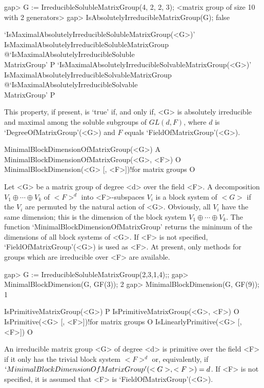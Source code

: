 \beginexample
gap> G := IrreducibleSolubleMatrixGroup(4, 2, 2, 3);
<matrix group of size 10 with 2 generators>
gap> IsAbsolutelyIrreducibleMatrixGroup(G);
false
\endexample

\>`IsMaximalAbsolutelyIrreducibleSolubleMatrixGroup(<G>)'%
{IsMaximalAbsolutelyIrreducibleSolubleMatrixGroup}%
@{`IsMaximalAbsolutelyIrreducibleSoluble\\MatrixGroup'} P
\>`IsMaximalAbsolutelyIrreducibleSolvableMatrixGroup(<G>)'%
{IsMaximalAbsolutelyIrreducibleSolvableMatrixGroup}%
@{`IsMaximalAbsolutelyIrreducibleSolvable\\MatrixGroup'} P

This property, if present, is `true' if, and only if, <G> is absolutely irreducible and maximal among 
the soluble subgroups of $GL(d, F)$, where $d$ is `DegreeOfMatrixGroup'(<G>) and
$F$ equals `FieldOfMatrixGroup'(<G>). 

\null


\>MinimalBlockDimensionOfMatrixGroup(<G>) A
\>MinimalBlockDimensionOfMatrixGroup(<G>, <F>) O
\>MinimalBlockDimension(<G> [, <F>])!{for matrix groups} O

Let <G> be a matrix group of degree <d> over the field <F>.  A 
decomposition $V_1 \oplus \cdots \oplus V_k$ of $<F>^d$ into <F>-subspaces
$V_i$ is a block system of $<G>$ if the $V_i$ are permuted by the natural
action of <G>. Obviously, all $V_i$ have the same dimension; this is the
dimension of the block system
$V_1 \oplus \cdots \oplus V_k$. The function
`MinimalBlockDimensionOfMatrixGroup' returns the minimum of the dimensions
of all block systems of <G>. If <F> is not specified, `FieldOfMatrixGroup'(<G>)
 is used as <F>. At present, only methods for groups 
which are irreducible over <F> are available.

\beginexample
gap> G := IrreducibleSolubleMatrixGroup(2,3,1,4);;
gap> MinimalBlockDimension(G, GF(3));
2
gap> MinimalBlockDimension(G, GF(9));
1
\endexample

\>IsPrimitiveMatrixGroup(<G>) P
\>IsPrimitiveMatrixGroup(<G>, <F>) O
\>IsPrimitive(<G> [, <F>])!{for matrix groups} O
\>IsLinearlyPrimitive(<G> [, <F>]) O

An irreducible matrix group <G> of degree <d> is primitive over the field <F> if it
only has the trivial block system $<F>^d$ or, equivalently, if
$`MinimalBlockDimensionOfMatrixGroup'(<G>, <F>) = d$. If <F> is not
specified, it is assumed that <F> is `FieldOfMatrixGroup'(<G>).

